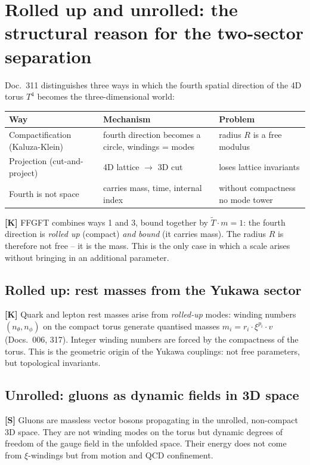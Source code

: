 \section{Rolled up and unrolled: the structural reason for the two-sector separation}

Doc.~311 distinguishes three ways in which the fourth spatial direction
of the 4D torus $T^4$ becomes the three-dimensional world:

\begin{center}
\begin{tabular}{lll}
\toprule
Way & Mechanism & Problem \\
\midrule
Compactification (Kaluza-Klein) & fourth direction becomes a circle, windings = modes
  & radius $R$ is a free modulus \\
Projection (cut-and-project) & 4D lattice $\to$ 3D cut
  & loses lattice invariants \\
Fourth is not space & carries mass, time, internal index
  & without compactness no mode tower \\
\bottomrule
\end{tabular}
\end{center}

\textbf{[K]} FFGFT combines ways 1 and 3, bound together by
$\tilde{T} \cdot m = 1$: the fourth direction is \emph{rolled up}
(compact) \emph{and} \emph{bound} (it carries mass). The radius $R$ is
therefore not free -- it is the mass. This is the only case in which a
scale arises without bringing in an additional parameter.

\subsection{Rolled up: rest masses from the Yukawa sector}

\textbf{[K]} Quark and lepton rest masses arise from \emph{rolled-up}
modes: winding numbers $(n_\theta, n_\phi)$ on the compact torus
generate quantised masses $m_i = r_i \cdot \xi^{p_i} \cdot v$
(Docs.~006, 317). Integer winding numbers are forced by the compactness
of the torus. This is the geometric origin of the Yukawa couplings: not
free parameters, but topological invariants.

\subsection{Unrolled: gluons as dynamic fields in 3D space}

\textbf{[S]} Gluons are massless vector bosons propagating in the
unrolled, non-compact 3D space. They are not winding modes on the torus
but dynamic degrees of freedom of the gauge field in the unfolded space.
Their energy does not come from $\xi$-windings but from motion and QCD
confinement.

